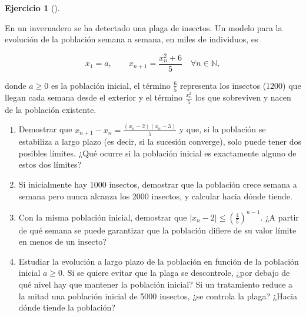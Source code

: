 \documentclass[
  spanish,
  a4paper,
]{scrreport}
\theoremstyle{definition}
\newtheorem{exercise}{Ejercicio}[chapter]
\theoremstyle{remark}
\begin{document}
\begin{exercise}[]\protect\hypertarget{exr-2}{}\label{exr-2}

En un invernadero se ha detectado una plaga de insectos. Un modelo para
la evolución de la población semana a semana, en miles de individuos, es

\[
x_1 = a, \qquad x_{n+1} = \frac{x_n^2+6}{5}\quad \forall n\in\mathbb{N},
\]

donde \(a\geq 0\) es la población inicial, el término \(\frac{6}{5}\)
representa los insectos (1200) que llegan cada semana desde el exterior
y el término \(\frac{x_n^2}{5}\) los que sobreviven y nacen de la
población existente.

\begin{enumerate}
\def\labelenumi{\alph{enumi}.}
\item
  Demostrar que \(x_{n+1}-x_n = \frac{(x_n-2)(x_n-3)}{5}\) y que, si la
  población se estabiliza a largo plazo (es decir, si la sucesión
  converge), solo puede tener dos posibles límites. ¿Qué ocurre si la
  población inicial es exactamente alguno de estos dos límites?
\item
  Si inicialmente hay 1000 insectos, demostrar que la población crece
  semana a semana pero nunca alcanza los 2000 insectos, y calcular hacia
  dónde tiende.
\item
  Con la misma población inicial, demostrar que
  \(|x_n-2|\leq\left(\frac{4}{5}\right)^{n-1}\). ¿A partir de qué semana
  se puede garantizar que la población difiere de su valor límite en
  menos de un insecto?
\item
  Estudiar la evolución a largo plazo de la población en función de la
  población inicial \(a\geq 0\). Si se quiere evitar que la plaga se
  descontrole, ¿por debajo de qué nivel hay que mantener la población
  inicial? Si un tratamiento reduce a la mitad una población inicial de
  5000 insectos, ¿se controla la plaga? ¿Hacia dónde tiende la
  población?
\end{enumerate}

\end{exercise}
\end{document}
